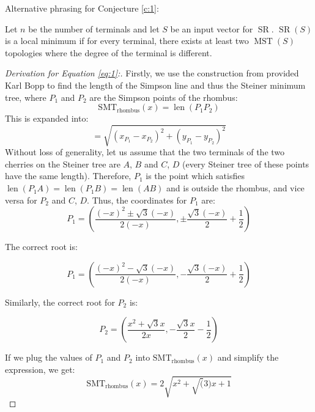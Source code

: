 \documentclass{mpaper}
\begin{document}
Alternative phrasing for Conjecture \ref{c:1}:

\begin{conjecture}
  Let $n$ be the number of terminals and let $S$ be an input vector for $\operatorname{SR}$. $\operatorname{SR}(S)$ is a local minimum if for every terminal, there exists at least two $\operatorname{MST}(S)$ topologies where the degree of the terminal is different.
\end{conjecture}


\begin{proof} [Derivation for Equation \ref{eq:1}:]

Firstly, we use the construction from provided Karl Bopp \cite{bopp} to find the length of the Simpson line and thus the Steiner minimum tree, where $P_1$ and $P_2$ are the Simpson points of the rhombus:
\[
  \operatorname{SMT_{rhombus}}(x) = \operatorname{len}(P_1P_2)
\]
This is expanded into:
\[
  = \sqrt{(x_{P_1}-x_{P_2})^2+(y_{P_1}-y_{P_2})^2}
\]
Without loss of generality, let us assume that the two terminals of the two cherries on the Steiner tree are $A$, $B$ and $C$, $D$ (every Steiner tree of these points have the same length). Therefore, $P_1$ is the point which satisfies $\operatorname{len}(P_1A)=\operatorname{len}(P_1B)=\operatorname{len}(AB)$ and is outside the rhombus, and vice versa for $P_2$ and $C$, $D$. Thus, the coordinates for $P_1$ are:
\[
  P_1 = \left(\frac{(-x)^{2} \pm \sqrt{3} (-x)}{2 (-x)}, \pm \frac{\sqrt{3} (-x)}{2} + \frac{1}{2}\right)
\]

The correct root is:

\[
  P_1 = \left(\frac{(-x)^{2} - \sqrt{3} (-x)}{2 (-x)}, - \frac{\sqrt{3} (-x)}{2} + \frac{1}{2}\right)
\]

Similarly, the correct root for $P_2$ is:

\[
  P_2 =\left(\frac{x^{2} + \sqrt{3} x}{2 x}, - \frac{\sqrt{3} x}{2} - \frac{1}{2}\right)
\]

If we plug the values of $P_1$ and $P_2$ into $\operatorname{SMT_{rhombus}}(x)$ and simplify the expression, we get:
\[
  \operatorname{SMT_{rhombus}}(x)=2\sqrt{x^2+\sqrt(3)x+1}
\]

  

  
  
\end{proof}
\end{document}
